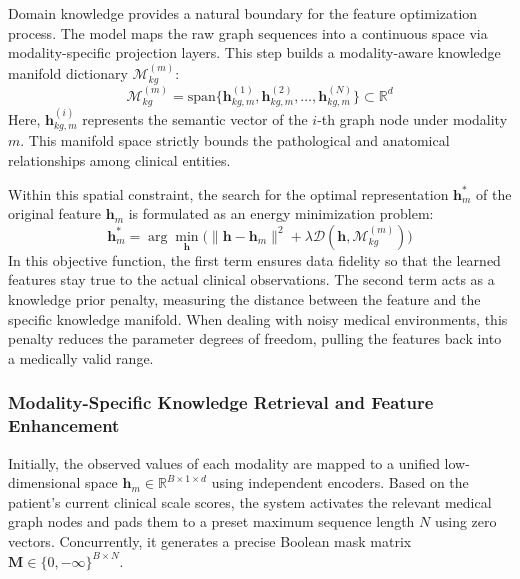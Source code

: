 \documentclass[lettersize,journal]{IEEEtran}
\begin{document}
Domain knowledge provides a natural boundary for the feature optimization process. The model maps the raw graph sequences into a continuous space via modality-specific projection layers. This step builds a modality-aware knowledge manifold dictionary $\mathcal{M}_{kg}^{(m)}$:
\begin{equation}
\mathcal{M}_{kg}^{(m)} = \mathrm{span} \{ \mathbf{h}_{kg, m}^{(1)}, \mathbf{h}_{kg, m}^{(2)}, \dots, \mathbf{h}_{kg, m}^{(N)} \} \subset \mathbb{R}^d
\label{eq:manifold_dict}
\end{equation}
Here, $\mathbf{h}_{kg, m}^{(i)}$ represents the semantic vector of the $i$-th graph node under modality $m$. This manifold space strictly bounds the pathological and anatomical relationships among clinical entities.

Within this spatial constraint, the search for the optimal representation $\mathbf{h}_m^*$ of the original feature $\mathbf{h}_m$ is formulated as an energy minimization problem:
\begin{equation}
\mathbf{h}_m^* = \arg\min_{\mathbf{h}} \Big( \| \mathbf{h} - \mathbf{h}_m \|^2 + \lambda \mathcal{D}(\mathbf{h}, \mathcal{M}_{kg}^{(m)}) \Big)
\label{eq:energy_min}
\end{equation}
In this objective function, the first term ensures data fidelity so that the learned features stay true to the actual clinical observations. The second term acts as a knowledge prior penalty, measuring the distance between the feature and the specific knowledge manifold. When dealing with noisy medical environments, this penalty reduces the parameter degrees of freedom, pulling the features back into a medically valid range.

\subsubsection{Modality-Specific Knowledge Retrieval and Feature Enhancement}

Initially, the observed values of each modality are mapped to a unified low-dimensional space $\mathbf{h}_m \in \mathbb{R}^{B \times 1 \times d}$ using independent encoders. Based on the patient's current clinical scale scores, the system activates the relevant medical graph nodes and pads them to a preset maximum sequence length $N$ using zero vectors. Concurrently, it generates a precise Boolean mask matrix $\mathbf{M} \in \{0, -\infty\}^{B\times N}$.
\end{document}
